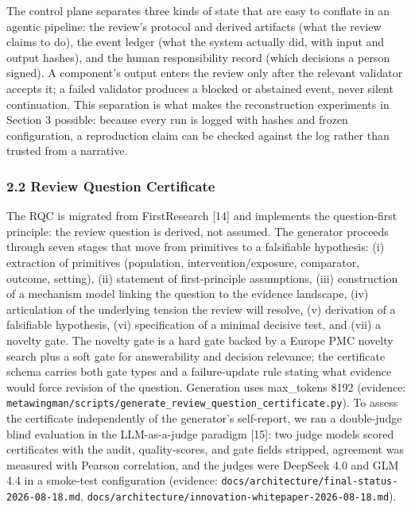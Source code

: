 \documentclass[
]{article}
\begin{document}
The control plane separates three kinds of state that are easy to
conflate in an agentic pipeline: the review's protocol and derived
artifacts (what the review claims to do), the event ledger (what the
system actually did, with input and output hashes), and the human
responsibility record (which decisions a person signed). A component's
output enters the review only after the relevant validator accepts it; a
failed validator produces a blocked or abstained event, never silent
continuation. This separation is what makes the reconstruction
experiments in Section 3 possible: because every run is logged with
hashes and frozen configuration, a reproduction claim can be checked
against the log rather than trusted from a narrative.

\subsubsection{2.2 Review Question
Certificate}\label{review-question-certificate}

The RQC is migrated from FirstResearch {[}14{]} and implements the
question-first principle: the review question is derived, not assumed.
The generator proceeds through seven stages that move from primitives to
a falsifiable hypothesis: (i) extraction of primitives (population,
intervention/exposure, comparator, outcome, setting), (ii) statement of
first-principle assumptions, (iii) construction of a mechanism model
linking the question to the evidence landscape, (iv) articulation of the
underlying tension the review will resolve, (v) derivation of a
falsifiable hypothesis, (vi) specification of a minimal decisive test,
and (vii) a novelty gate. The novelty gate is a hard gate backed by a
Europe PMC novelty search plus a soft gate for answerability and
decision relevance; the certificate schema carries both gate types and a
failure-update rule stating what evidence would force revision of the
question. Generation uses max\_tokens 8192 (evidence:
\texttt{metawingman/scripts/generate\_review\_question\_certificate.py}).
To assess the certificate independently of the generator's self-report,
we ran a double-judge blind evaluation in the LLM-as-a-judge paradigm
{[}15{]}: two judge models scored certificates with the audit,
quality-scores, and gate fields stripped, agreement was measured with
Pearson correlation, and the judges were DeepSeek 4.0 and GLM 4.4 in a
smoke-test configuration (evidence:
\texttt{docs/architecture/final-status-2026-08-18.md},
\texttt{docs/architecture/innovation-whitepaper-2026-08-18.md}).
\end{document}
